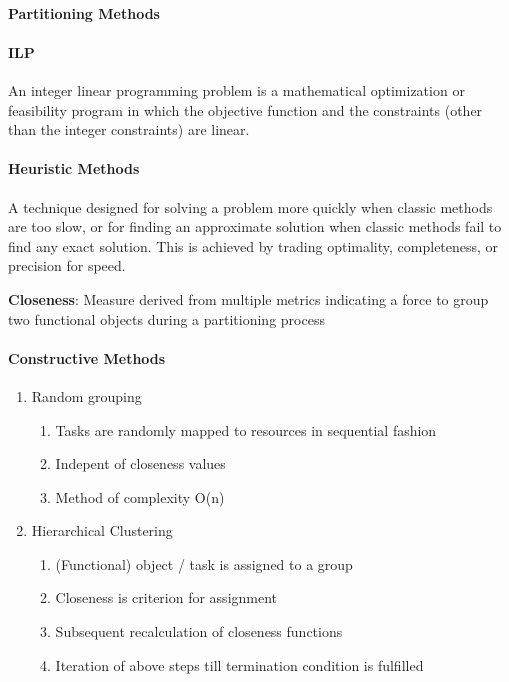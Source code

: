 \documentclass[english]{latex4ei/latex4ei_sheet}
\begin{document}
\paragraph{Partitioning Methods}

\paragraph{ILP} An integer linear programming problem is a mathematical optimization or feasibility program in which the objective function and the constraints (other than the integer constraints) are linear.

\paragraph{Heuristic Methods}
A technique designed for solving a problem more quickly when classic methods are too slow, or for finding an approximate solution when classic methods fail to find any exact solution. This is achieved by trading optimality, completeness, or precision for speed.

\textbf{Closeness}: Measure derived from multiple metrics indicating a force to group two functional objects during a partitioning process

\paragraph{Constructive Methods}
\begin{enumerate}
  \item Random grouping
    \begin{enumerate}
      \item Tasks are randomly mapped to resources in sequential fashion
      \item  Indepent of closeness values
      \item Method of complexity O(n)
    \end{enumerate}

  \item Hierarchical Clustering
    \begin{enumerate}
      \item (Functional) object / task is assigned to a group
      \item Closeness is criterion for assignment
      \item Subsequent recalculation of closeness functions
      \item Iteration of above steps till termination condition is fulfilled
    \end{enumerate}
\end{enumerate}
\end{document}
